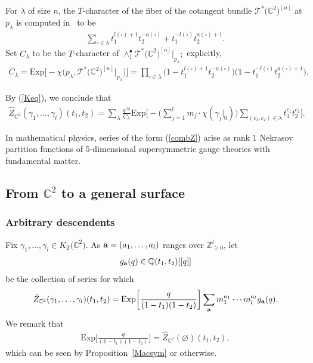 \documentclass[pdftex]{sigma}
\numberwithin{equation}{section}
\newcommand{\Exp}{\mathrm{Exp}}
\def\C{\mathbb C}
\def\Q{\mathbb Q}
\def\Z{\mathbb Z}
\begin{document}
For $\lambda$ of size $n$, the $T$-character of the fiber of the cotangent bundle $\mathcal{T}^{*}\big(\C^2\big)^{[n]}$ at $p_{\lambda}$ is computed in~\cite[Lemma~3.2]{ES} to be
\begin{gather*}
\sum_{\square\in\lambda} t_1^{l(\square)+1}t_2^{-a(\square)}+t_1^{-l(\square)}t_2^{a(\square)+1}.
\end{gather*}
Set $C_{\lambda}$ to be the $T$-character of ${\wedge^{\bullet}_1 \mathcal{T}^{*}\big(\C^2\big)^{[n]}|_{p_{\lambda}}};$ explicitly,
\begin{align}\label{Clambdadef} C_{\lambda}=\Exp\big[{-}\chi\big(p_{\lambda},\mathcal{T}^{*}\big(\C^2\big)^{[n]}|_{p_{\lambda}}\big)\big]= \prod_{\square\in\lambda}{\big(1- t_1^{l(\square)+1}t_2^{-a(\square)}\big) \big(1-t_1^{-l(\square)}t_2^{a(\square)+1}\big)}.
\end{align}

By (\ref{Keq}), we conclude that
\begin{align}\label{combZ}
\hat{Z}_{\C^2}(\gamma_1,\dots,\gamma_l)(t_1,t_2)=\sum_{\lambda}\frac{q^{|\lambda|}}{C_{\lambda}} \Exp\biggl[{-} \biggl(\sum_{j=1}^{l}m_j\cdot \chi(\gamma_j|_0)\biggr)\sum_{(c_1,c_2)\in \lambda} t_1^{c_1}t_2^{c_2} \biggr].
\end{align}

In mathematical physics, series of the form (\ref{combZ}) arise as rank $1$ Nekrasov partition functions of 5-dimensional supersymmetric gauge theories with fundamental matter.

\subsection[From C\textasciicircum{}2 to a general surface]{From $\mathbb{C}^2$ to a general surface}

\subsubsection{Arbitrary descendents}\label{arbitrary}

Fix $\gamma_1,\dots,\gamma_l\in K_T\big(\C^2\big)$. As ${\bf a}=(a_1,\dots,a_l)$ ranges over $\Z_{\geq 0}^{l}$, let
\begin{gather*}
g_{{\bf a}}(q)\in \Q(t_1,t_2)[[q]]
\end{gather*}
be the collection of series for which
\begin{align}\label{gdef} \hat{Z}_{\C^2}(\gamma_1,\dots,\gamma_l)(t_1,t_2)=\Exp\bigg[\frac{q}{(1-t_1)(1-t_2)}\bigg] \sum_{\bf{a}}m_1^{a_1}\cdots m_l^{a_l} g_{\bf{a}}(q).
\end{align}
We remark that
\begin{gather*}
\Exp\bigg[\frac{q}{(1-t_1)(1-t_2)}\bigg]=\hat{Z}_{\C^2}(\varnothing)(t_1,t_2),
\end{gather*}
which can be seen by Proposition~\ref{Macsym} or otherwise.
\end{document}
